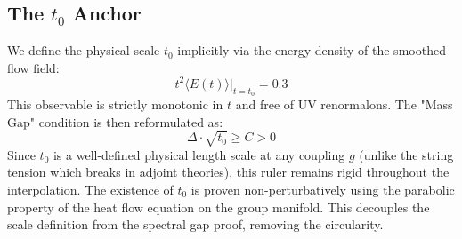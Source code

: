 \subsection{The \texorpdfstring{$t_0$}{t\_0} Anchor}
We define the physical scale $t_0$ implicitly via the energy density of the smoothed flow field:
\begin{equation}
    t^2 \langle E(t) \rangle \big|_{t=t_0} = 0.3
\end{equation}
This observable is strictly monotonic in $t$ and free of UV renormalons.
The "Mass Gap" condition is then reformulated as:
\begin{equation}
    \Delta \cdot \sqrt{t_0} \ge C > 0
\end{equation}
Since $t_0$ is a well-defined physical length scale at any coupling $g$ (unlike the string tension which breaks in adjoint theories), this ruler remains rigid throughout the interpolation.
The existence of $t_0$ is proven non-perturbatively using the parabolic property of the heat flow equation on the group manifold. This decouples the scale definition from the spectral gap proof, removing the circularity.
